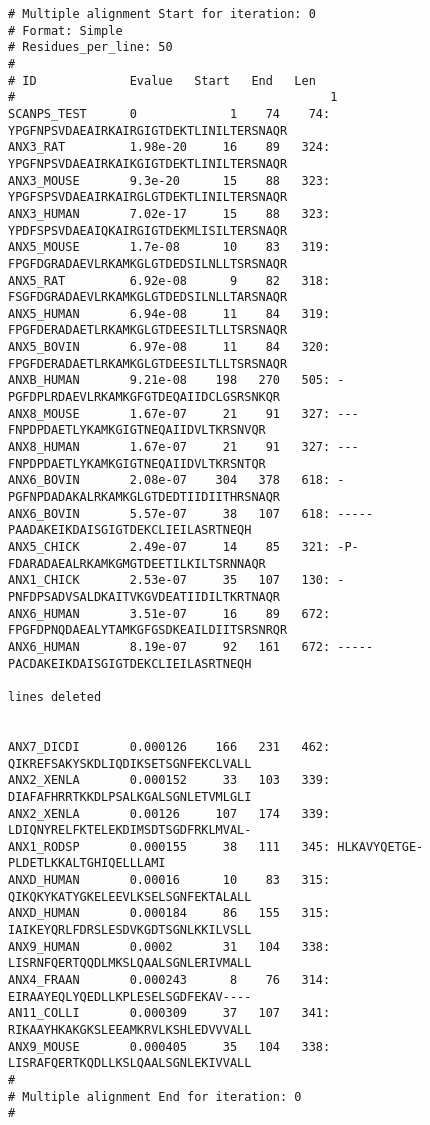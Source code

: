 \documentclass[12pt]{article}
\begin{document}
\begin{scriptsize}
\begin{verbatim}
# Multiple alignment Start for iteration: 0
# Format: Simple
# Residues_per_line: 50
#
# ID             Evalue   Start   End   Len
#                                            1         
SCANPS_TEST      0             1    74    74: YPGFNPSVDAEAIRKAIRGIGTDEKTLINILTERSNAQR
ANX3_RAT         1.98e-20     16    89   324: YPGFNPSVDAEAIRKAIKGIGTDEKTLINILTERSNAQR
ANX3_MOUSE       9.3e-20      15    88   323: YPGFSPSVDAEAIRKAIRGLGTDEKTLINILTERSNAQR
ANX3_HUMAN       7.02e-17     15    88   323: YPDFSPSVDAEAIQKAIRGIGTDEKMLISILTERSNAQR
ANX5_MOUSE       1.7e-08      10    83   319: FPGFDGRADAEVLRKAMKGLGTDEDSILNLLTSRSNAQR
ANX5_RAT         6.92e-08      9    82   318: FSGFDGRADAEVLRKAMKGLGTDEDSILNLLTARSNAQR
ANX5_HUMAN       6.94e-08     11    84   319: FPGFDERADAETLRKAMKGLGTDEESILTLLTSRSNAQR
ANX5_BOVIN       6.97e-08     11    84   320: FPGFDERADAETLRKAMKGLGTDEESILTLLTSRSNAQR
ANXB_HUMAN       9.21e-08    198   270   505: -PGFDPLRDAEVLRKAMKGFGTDEQAIIDCLGSRSNKQR
ANX8_MOUSE       1.67e-07     21    91   327: ---FNPDPDAETLYKAMKGIGTNEQAIIDVLTKRSNVQR
ANX8_HUMAN       1.67e-07     21    91   327: ---FNPDPDAETLYKAMKGIGTNEQAIIDVLTKRSNTQR
ANX6_BOVIN       2.08e-07    304   378   618: -PGFNPDADAKALRKAMKGLGTDEDTIIDIITHRSNAQR
ANX6_BOVIN       5.57e-07     38   107   618: -----PAADAKEIKDAISGIGTDEKCLIEILASRTNEQH
ANX5_CHICK       2.49e-07     14    85   321: -P-FDARADAEALRKAMKGMGTDEETILKILTSRNNAQR
ANX1_CHICK       2.53e-07     35   107   130: -PNFDPSADVSALDKAITVKGVDEATIIDILTKRTNAQR
ANX6_HUMAN       3.51e-07     16    89   672: FPGFDPNQDAEALYTAMKGFGSDKEAILDIITSRSNRQR
ANX6_HUMAN       8.19e-07     92   161   672: -----PACDAKEIKDAISGIGTDEKCLIEILASRTNEQH

lines deleted


ANX7_DICDI       0.000126    166   231   462: QIKREFSAKYSKDLIQDIKSETSGNFEKCLVALL
ANX2_XENLA       0.000152     33   103   339: DIAFAFHRRTKKDLPSALKGALSGNLETVMLGLI
ANX2_XENLA       0.00126     107   174   339: LDIQNYRELFKTELEKDIMSDTSGDFRKLMVAL-
ANX1_RODSP       0.000155     38   111   345: HLKAVYQETGE-PLDETLKKALTGHIQELLLAMI
ANXD_HUMAN       0.00016      10    83   315: QIKQKYKATYGKELEEVLKSELSGNFEKTALALL
ANXD_HUMAN       0.000184     86   155   315: IAIKEYQRLFDRSLESDVKGDTSGNLKKILVSLL
ANX9_HUMAN       0.0002       31   104   338: LISRNFQERTQQDLMKSLQAALSGNLERIVMALL
ANX4_FRAAN       0.000243      8    76   314: EIRAAYEQLYQEDLLKPLESELSGDFEKAV----
AN11_COLLI       0.000309     37   107   341: RIKAAYHKAKGKSLEEAMKRVLKSHLEDVVVALL
ANX9_MOUSE       0.000405     35   104   338: LISRAFQERTKQDLLKSLQAALSGNLEKIVVALL
#
# Multiple alignment End for iteration: 0
#
\end{verbatim}
\end{scriptsize}
\end{document}
